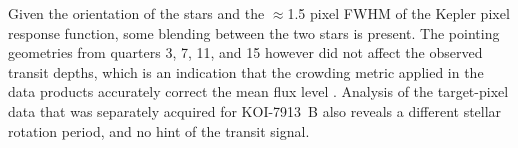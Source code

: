 \documentclass[12pt,twocolumn,tighten,linenumbers,trackchanges]{aastex63}
\begin{document}
Given the orientation of the stars and the $\approx$1.5 pixel FWHM of
the Kepler pixel response function, some blending between the two
stars is present.  The pointing geometries from quarters 3, 7, 11, and
15 however did not affect the observed transit depths,
which is an indication that the crowding metric applied in the data
products accurately correct the mean flux level
\citep{2017ksci.rept....6M}.  Analysis of the target-pixel data that
was separately acquired for KOI-7913~B also reveals a
different stellar rotation period, and no hint of the transit signal.


\vspace{-6cm}



\clearpage
\listofchanges
\end{document}

